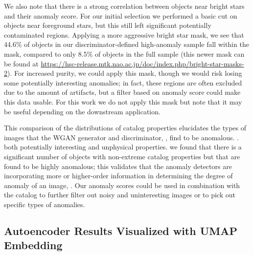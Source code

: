 We also note that there is a strong correlation between objects near bright stars and their anomaly score.
For our initial selection we performed a basic cut on objects near foreground stars, but this still left significant potentially contaminated regions.
Applying a more aggressive bright star mask, we see that 44.6\% of objects in our discriminator-defined high-anomaly sample fall within the mask, compared to only 8.5\% of objects in the full sample (this newer mask can be found at \url{https://hsc-release.mtk.nao.ac.jp/doc/index.php/bright-star-masks-2}).
For increased purity, we could apply this mask, though we would risk losing some potentially interesting anomalies; in fact, these regions are often excluded due to the amount of artifacts, but a filter based on anomaly score could make this data usable.
For this work we do not apply this mask but note that it may be useful depending on the downstream application.

This comparison of the distributions of catalog properties elucidates the types of images that the WGAN generator and discriminator, , find to be anomalous. 
. 
 both potentially interesting and unphysical properties.
 we found that there is a significant number of objects with non-extreme catalog properties but that are found to be highly anomalous; this validates that the anomaly detectors are incorporating more or higher-order information in determining the degree of anomaly of an image, .
Our anomaly scores could be used in combination with the catalog to further filter out noisy and uninteresting images or to pick out specific types of anomalies.


\subsection{Autoencoder Results Visualized with UMAP Embedding}
\label{sec:cae-umap}

